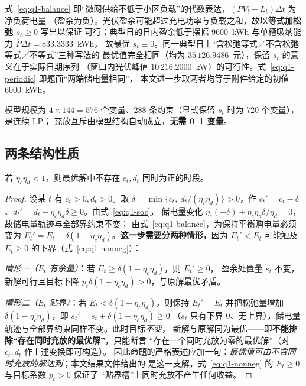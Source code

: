 式~\eqref{eq:q1-balance} 即“微网供给不低于小区负载”的代数表达，\((PV_t-L_t)\Delta t\) 为净负荷电量
（盈余为负）。光伏盈余可能超过充电功率与负载之和，故以\textbf{等式加松弛 \(s_t\ge0\)} 写出以保证
可行；典型日的日内盈余低于摆幅 9600~kWh 与单槽吸纳能力 \(\overline P\Delta t=833.3333\)~kWh，
故最优 \(s_t\equiv0\)。同一典型日上“含松弛等式／不含松弛等式／不等式”三种写法的
最优值完全相同（均为 \(35\,126.9486\)~元），保留 \(s_t\) 的意义在于实际日期序列
（窗口内光伏峰值 \(10\,216.2000\)~kW）的可行性。式~\eqref{eq:q1-periodic} 即题面“两端储电量相同”，
本文进一步取两者均等于附件给定的初值 6000~kWh。

模型规模为 \(4\times144=576\) 个变量、288 条约束（显式保留 \(s_t\) 时为 720 个变量），是连续 LP；
充放互斥由模型结构自动成立，\textbf{无需 0--1 变量}。

\subsection{两条结构性质}

\begin{proposition}[充放互斥]\label{prop:no-simul}
若 \(\eta_c\eta_d<1\)，则最优解中不存在 \(c_t,d_t\) 同时为正的时段。
\end{proposition}

\begin{proof}
设某 \(t\) 有 \(c_t>0,d_t>0\)。取 \(\delta=\min\{c_t,\ d_t/(\eta_c\eta_d)\}>0\)，作
\(c_t'=c_t-\delta\)、\(d_t'=d_t-\eta_c\eta_d\delta\ge0\)。由式~\eqref{eq:q1-soc}，
储电量变化 \(\eta_c(-\delta)+\eta_c\eta_d\delta/\eta_d=0\)，故储电量轨迹与全部界约束不变；
由式~\eqref{eq:q1-balance}，为保持平衡购电量必须变为
\(E_t'=E_t-\delta(1-\eta_c\eta_d)\)。\textbf{这一步需要分两种情形}，因为
\(E_t'<E_t\) 可能触及 \(E_t\ge0\) 的下界（式~\eqref{eq:q1-nonneg}）：

\emph{情形一（\(E_t\) 有余量）}：若 \(E_t\ge\delta(1-\eta_c\eta_d)\)，则 \(E_t'\ge0\)，
盈余处置量 \(s_t\) 不变，新解可行且目标下降
\(p_t\delta(1-\eta_c\eta_d)>0\)，与原解最优矛盾。

\emph{情形二（\(E_t\) 贴界）}：若 \(E_t<\delta(1-\eta_c\eta_d)\)，则保持 \(E_t'=E_t\)
并把松弛量增加 \(\delta(1-\eta_c\eta_d)\)，即 \(s_t'=s_t+\delta(1-\eta_c\eta_d)\ge0\)
（\(s_t\) 只有下界 \(0\)、无上界），储电量轨迹与全部界约束同样不变。此时目标\emph{不变}，
新解与原解同为最优——即\textbf{不能排除“存在同时充放的最优解”}，只能断言
“存在一个同时充放为零的最优解”（对 \(c_t,d_t\) 作上述变换即可构造）。
因此命题的严格表述应加一句：\emph{最优值可由不含同时充放的解达到}；本文结果文件给出的
是这一支解，式~\eqref{eq:q1-nonneg} 的 \(E_t\ge0\) 与目标系数 \(p_t>0\) 保证了
“贴界槽”上同时充放不产生任何收益。
\end{proof}


